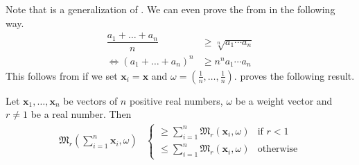 \documentclass[inequalities.tex]{subfile}
\begin{document}
	Note that  is a generalization of . We can even prove the  from  in the following way.
		\begin{align*}
			\dfrac{a_{1}+\ldots+a_{n}}{n}
				& \geq \sqrt[n]{a_{1}\cdots a_{n}}\\
			\iff (a_{1}+\ldots+a_{n})^{n}
				& \geq n^{n}a_{1}\cdots a_{n}
		\end{align*}
	This follows from  if we set $\mathbf{x}_{i}=\mathbf{x}$ and $\omega=\left(\frac{1}{n},\ldots,\frac{1}{n}\right)$. \textcite[Page $115-117$]{minkowski_1968} proves the following result.
		\begin{theorem}\label{thm:mink}
			Let $\mathbf{x}_{1},\ldots,\mathbf{x}_{n}$ be vectors of $n$ positive real numbers, $\omega$ be a weight vector and $r\neq1$ be a real number. Then
				\begin{align*}
					\mathfrak{M}_{r}\left(\sum_{i=1}^{n}\mathbf{x}_{i},\omega\right)
						&
							\begin{cases}
								\geq \sum_{i=1}^{n}\mathfrak{M}_{r}(\mathbf{x}_{i},\omega)& \mbox{if }r<1\\
								\leq \sum_{i=1}^{n}\mathfrak{M}_{r}(\mathbf{x}_{i}, \omega)& \mbox{otherwise}
							\end{cases}
				\end{align*}
		\end{theorem}
\end{document}
